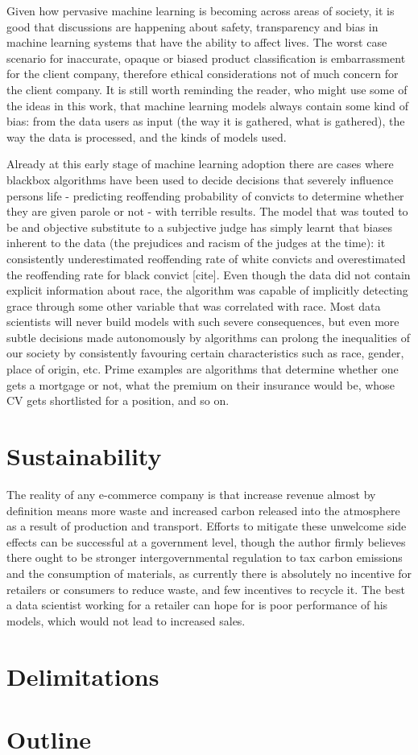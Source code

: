 Given how pervasive  machine learning is becoming across areas of society, it is good that discussions are happening about safety, transparency and bias in machine learning systems that have the ability to affect lives.
The worst case scenario for inaccurate,  opaque or biased product classification  is embarrassment for the client company,  therefore ethical considerations not of much concern for the client company.
It is still worth reminding the reader, who might use some of the ideas in this work,  that machine learning  models always contain some kind of bias:  from the data users as input (the way it is gathered, what is gathered),  the way the data is processed, and the kinds of models used.

Already at this early stage of machine learning adoption there are cases where blackbox algorithms have been used to decide decisions that severely influence persons life -  predicting reoffending probability  of convicts to determine  whether they are given parole or not - with terrible results.
The model that was touted to be and objective substitute to a subjective judge has simply learnt that biases inherent to the data (the prejudices and racism of  the judges at the time):  it consistently underestimated reoffending rate of white convicts and overestimated the reoffending rate for black convict [cite].
Even though the data did not contain explicit information about race, the algorithm  was capable of implicitly detecting grace through some other variable that was correlated with race.
Most data scientists will never build models with such severe consequences, but even more subtle decisions  made autonomously by algorithms  can prolong the  inequalities of our society by consistently favouring certain  characteristics such as race, gender, place of origin, etc.
Prime examples are algorithms that determine whether one gets a mortgage or not, what the premium on their insurance would be, whose CV gets shortlisted for a position, and so on.

\section{Sustainability}

The reality of any e-commerce company is that increase revenue almost by definition means more waste  and increased carbon released into the atmosphere  as a result of production and transport.
Efforts to mitigate these unwelcome side effects can be successful at a government level, though  the author firmly believes there ought to be stronger intergovernmental regulation to tax carbon emissions and the consumption of materials, as currently there is absolutely no incentive for retailers or consumers to reduce waste, and few incentives to recycle it.
The best a data scientist working for a retailer can hope for is poor performance of his models, which would not lead to increased sales.

\section{Delimitations}
\section{Outline}
